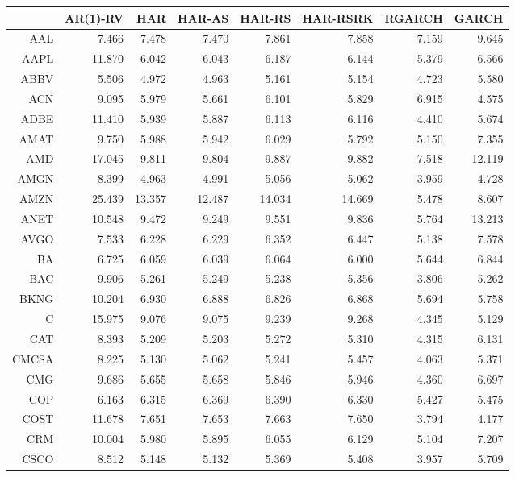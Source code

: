\begin{table}[ht]
\centering
\begin{tabular}{rrrrrrrr}
  \hline
 & AR(1)-RV & HAR & HAR-AS & HAR-RS & HAR-RSRK & RGARCH & GARCH \\ 
  \hline
AAL & 7.466 & 7.478 & 7.470 & 7.861 & 7.858 & 7.159 & 9.645 \\ 
  AAPL & 11.870 & 6.042 & 6.043 & 6.187 & 6.144 & 5.379 & 6.566 \\ 
  ABBV & 5.506 & 4.972 & 4.963 & 5.161 & 5.154 & 4.723 & 5.580 \\ 
  ACN & 9.095 & 5.979 & 5.661 & 6.101 & 5.829 & 6.915 & 4.575 \\ 
  ADBE & 11.410 & 5.939 & 5.887 & 6.113 & 6.116 & 4.410 & 5.674 \\ 
  AMAT & 9.750 & 5.988 & 5.942 & 6.029 & 5.792 & 5.150 & 7.355 \\ 
  AMD & 17.045 & 9.811 & 9.804 & 9.887 & 9.882 & 7.518 & 12.119 \\ 
  AMGN & 8.399 & 4.963 & 4.991 & 5.056 & 5.062 & 3.959 & 4.728 \\ 
  AMZN & 25.439 & 13.357 & 12.487 & 14.034 & 14.669 & 5.478 & 8.607 \\ 
  ANET & 10.548 & 9.472 & 9.249 & 9.551 & 9.836 & 5.764 & 13.213 \\ 
  AVGO & 7.533 & 6.228 & 6.229 & 6.352 & 6.447 & 5.138 & 7.578 \\ 
  BA & 6.725 & 6.059 & 6.039 & 6.064 & 6.000 & 5.644 & 6.844 \\ 
  BAC & 9.906 & 5.261 & 5.249 & 5.238 & 5.356 & 3.806 & 5.262 \\ 
  BKNG & 10.204 & 6.930 & 6.888 & 6.826 & 6.868 & 5.694 & 5.758 \\ 
  C & 15.975 & 9.076 & 9.075 & 9.239 & 9.268 & 4.345 & 5.129 \\ 
  CAT & 8.393 & 5.209 & 5.203 & 5.272 & 5.310 & 4.315 & 6.131 \\ 
  CMCSA & 8.225 & 5.130 & 5.062 & 5.241 & 5.457 & 4.063 & 5.371 \\ 
  CMG & 9.686 & 5.655 & 5.658 & 5.846 & 5.946 & 4.360 & 6.697 \\ 
  COP & 6.163 & 6.315 & 6.369 & 6.390 & 6.330 & 5.427 & 5.475 \\ 
  COST & 11.678 & 7.651 & 7.653 & 7.663 & 7.650 & 3.794 & 4.177 \\ 
  CRM & 10.004 & 5.980 & 5.895 & 6.055 & 6.129 & 5.104 & 7.207 \\ 
  CSCO & 8.512 & 5.148 & 5.132 & 5.369 & 5.408 & 3.957 & 5.709 \\ 

\end{tabular}
\end{table}

